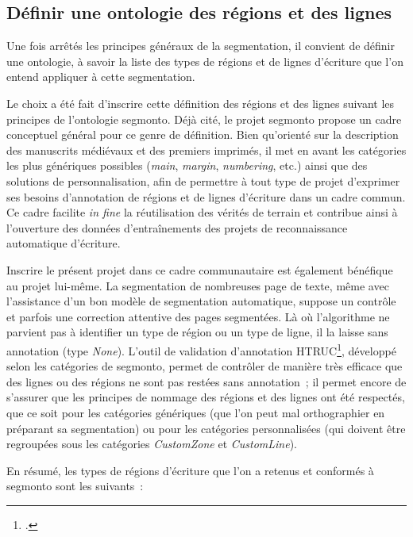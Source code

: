 \documentclass[a4paper,12pt,twoside]{book}
\begin{document}
			\subsection{Définir une ontologie des régions et des lignes}
				Une fois arrêtés les principes généraux de la segmentation, il convient de définir une ontologie, à savoir la liste des types de régions et de lignes d'écriture que l'on entend appliquer à cette segmentation.
				
				Le choix a été fait d'inscrire cette définition des régions et des lignes suivant les principes de l'ontologie \gls{segmonto}. Déjà cité, le projet \gls{segmonto} propose un cadre conceptuel général pour ce genre de définition. Bien qu'orienté sur la description des manuscrits médiévaux et des premiers imprimés, il met en avant les catégories les plus génériques possibles (\textit{main}, \textit{margin}, \textit{numbering}, etc.) ainsi que des solutions de personnalisation, afin de permettre à tout type de projet d'exprimer ses besoins d'annotation de régions et de lignes d'écriture dans un cadre commun. Ce cadre facilite \textit{in fine} la réutilisation des vérités de terrain et contribue ainsi à l'ouverture des données d'entraînements des projets de reconnaissance automatique d'écriture.
				
				Inscrire le présent projet dans ce cadre communautaire est également bénéfique au projet lui-même. La segmentation de nombreuses page de texte, même avec l'assistance d'un bon modèle de segmentation automatique, suppose un contrôle et parfois une correction attentive des pages segmentées. Là où l'algorithme ne parvient pas à identifier un type de région ou un type de ligne, il la laisse sans annotation (type \textit{None}). L'outil de validation d'annotation HTRUC\footcite{clericeHTRUCHTRUnitedCatalog2021}, développé selon les catégories de \gls{segmonto}, permet de contrôler de manière très efficace que des lignes ou des régions ne sont pas restées sans annotation~; il permet encore de s'assurer que les principes de nommage des régions et des lignes ont été respectés, que ce soit pour les catégories génériques (que l'on peut mal orthographier en préparant sa segmentation) ou pour les catégories personnalisées (qui doivent être regroupées sous les catégories \textit{CustomZone} et \textit{CustomLine}).
				
				En résumé, les types de régions d'écriture que l'on a retenus et conformés à \gls{segmonto} sont les suivants~:
				
\end{document}
